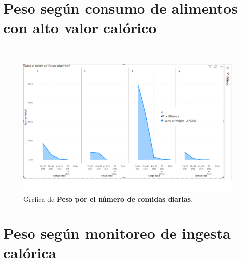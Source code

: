 \documentclass[a4paper]{report} %
\begin{document}
           \section{Peso según consumo de alimentos con alto valor calórico}
              \paragraph{}\mbox{} \\

\begin{figure}[htb]
                \centering
                  \includegraphics[width=\textwidth]{Images/pesoporcomidasdiarias.png}
                  \caption{Grafica de \textbf{Peso por el número de comidas diarias}.}
              \end{figure} 



\section{Peso según monitoreo de ingesta calórica}
\end{document}
